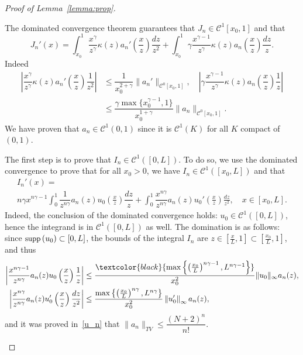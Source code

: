 \documentclass[AHL,Unicode,longabstracts,published]{cedram}
\newcommand*\dst{\displaystyle}
\newcommand{\clC}{\mathcal{C}}
\newcommand{\Mag}[1]{\textcolor{black}{#1}}
\newcommand*\supp{{\mbox{\small\rm supp}}\,}
\begin{document}
\begin{proof}[Proof of Lemma~\ref{lemma:prop}]
\begin{enumerate}
The dominated convergence theorem guarantees that $J_n\in \clC^1[x_0,1]$ and that
\begin{equation*}
J_n'(x)= \dst\int_{x_0}^{1} \dfrac{x^{\gamma}}{z^{\gamma}} \kappa(z) a_n'\left(\dfrac{x}{z}\right) \dfrac{dz}{z^2} + \dst\int_{x_0}^{1} \gamma\dfrac{x^{\gamma-1}}{z^{\gamma}} \kappa(z) a_n\left(\dfrac{x}{z}\right) \dfrac{dz}{z}.
\end{equation*}
Indeed
\begin{align*}
\left|\dfrac{x^{\gamma}}{z^{\gamma}} \kappa(z) a_n'\left(\dfrac{x}{z}\right) \dfrac{1}{z^2}\right|
&\leq \dfrac{1}{x_0^{2+\gamma}}\|a_n'\|_{\clC^0[x_0,1]}, \quad
\left|\gamma\dfrac{x^{\gamma-1}}{z^{\gamma}} \kappa(z) a_n\left(\dfrac{x}{z}\right) \dfrac{1}{z}\right|\\
&\leq \dfrac{\gamma \max\{x_0^{\gamma-1}, 1\}}{x_0^{1+\gamma}}\|a_n\|_{\clC^0[x_0,1]}.
\end{align*}
We have proven that $a_n\in\clC^1(0,1)$ since it is $\clC^1(K)$ for all $K$ compact of $(0,1)$.


The first step is to prove that $I_n \in \clC^1([0,L])$. To do so, we use the dominated convergence to prove that for all $x_0>0$, we have $I_n \in \clC^1([x_0,L])$ and that
\begin{multline}\label{I_n'}
I_n'(x) =\\
n \gamma x^{n\gamma-1} \dst\int_0^{1} \dfrac{1}{z^{n\gamma}}a_n(z) u_0\left(\frac{x}{z}\right) \dfrac{dz}{z} +\dst\int_0^{1}
\dfrac{x^{n\gamma}}{z^{n\gamma}} a_n(z) u_0'\left(\frac{x}{z}\right)
\frac{dz}{z^2}, \quad x\in [x_0,L].
\end{multline}
Indeed, the conclusion of the dominated convergence holds: $u_0 \in \clC^1([0,L])$, hence the integrand is in $\clC^1([0,L])$ as well. The domination is as follows: since $\supp(u_0)\subset [0,L]$, the bounds of the integral $I_n$ are $z\in \left[\frac{x}{L},1\right] \subset \left[\frac{x_0}{L},1\right]$, and thus
\begin{align*}
\left| \frac{x^{n\gamma-1} }{z^{n\gamma}}a_n(z) u_0\left(\frac{x}{z}\right)
\frac{1}{z}\right| &\leq \dfrac{\Mag{\max\left\{\left(\frac{x_0}{L}\right)^{n\gamma-1}, L^{n\gamma-1}\right\}}}{x_0^{2} }
\|u_0\|_{\infty}a_n(z),
\\
\left|\frac{x^{n\gamma}}{z^{n\gamma}} a_n(z) u_0'\left(\frac{x}{z}\right) \dfrac{dz}{z^2}\right| &\leq \frac{\max\left\{\left(\frac{x_0}{L}\right)^{n\gamma}, L^{n\gamma}\right\}}{x_0^{2}}
\left\|u_0'\right\|_{\infty} a_n(z),
\end{align*}
and it was proved in~\eqref{u_n} that $\|a_n\|_{TV} \leq \dfrac{(N+2)^n}{n!}$.


\end{enumerate}
\end{proof}
\end{document}
